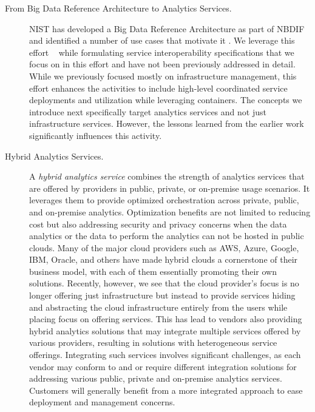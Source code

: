 \begin{description}

\item[From Big Data Reference Architecture to Analytics Services.]
\label{s:arch} NIST has developed a Big Data Reference Architecture as part of
NBDIF\cite{nist-v6} and identified a number of use cases that motivate
it \cite{nist-v3}. We leverage this effort
~\cite{nist-v1,nist-v2,nist-v3,nist-v4,nist-v5,nist-v6,nist-v7,nist-v8,nist-v9}
while formulating service interoperability specifications that we
focus on in this effort and have not been previously addressed in
detail. While we previously focused mostly on infrastructure
management, this effort enhances the activities to include high-level
coordinated service deployments and utilization while leveraging
containers. The concepts we introduce next specifically target analytics services and not just infrastructure services.
However, the lessons learned from the earlier work significantly
influences this activity.


\item[Hybrid Analytics Services.]

A {\em hybrid analytics service} combines the strength of analytics
services that are offered by providers in public, private, or
on-premise usage scenarios. It leverages them to provide
optimized orchestration across private, public, and on-premise
analytics. Optimization benefits are not limited to reducing cost but
also addressing security and privacy concerns when the data analytics
or the data to perform the analytics can not be hosted in public
clouds. Many of the major cloud providers such as AWS, Azure, Google,
IBM, Oracle, and others have made hybrid clouds a cornerstone of their
business model, with each of them essentially promoting their own
solutions. Recently, however, we see that the cloud provider's focus
is no longer offering just infrastructure but instead to provide
services hiding and abstracting the cloud infrastructure entirely from
the users while placing focus on offering services. This has lead to
vendors also providing hybrid analytics solutions that may integrate
multiple services offered by various providers, resulting in solutions
with heterogeneous service offerings. Integrating such services
involves significant challenges, as each vendor may conform to and or
require different integration solutions for addressing various public,
private and on-premise analytics services. Customers will generally
benefit from a more integrated approach to ease deployment and
management concerns.


\end{description}
